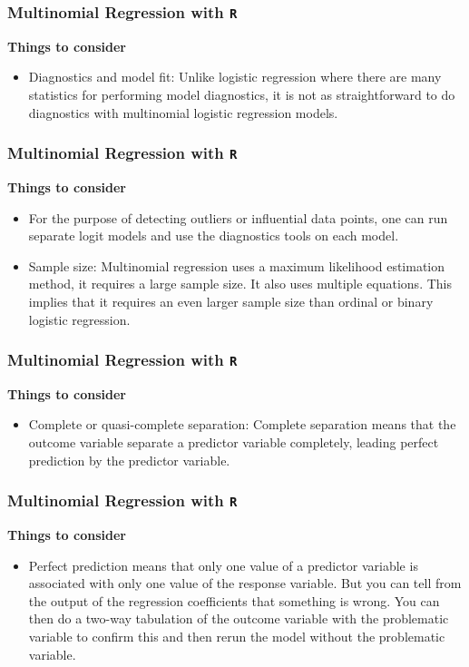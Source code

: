 \documentclass[00-GLMregslides.tex]{subfiles}
\begin{document}
\begin{frame}[fragile]
	
	\frametitle{Multinomial Regression with \texttt{R}}
	\Large
	\textbf{Things to consider}
	\begin{itemize}
		\item Diagnostics and model fit: Unlike logistic regression where there are many statistics for performing model diagnostics, it is not as straightforward to do diagnostics with multinomial logistic regression models.
\end{itemize}

\end{frame}
\begin{frame}[fragile]
	
	\frametitle{Multinomial Regression with \texttt{R}}
	\Large
	\textbf{Things to consider}
	\begin{itemize}
\item For the purpose of detecting outliers or influential data points, one can run separate logit models and use the diagnostics tools on each model. 
\item Sample size: Multinomial regression uses a maximum likelihood estimation method, it requires a large sample size. It also uses multiple equations. This implies that it requires an even larger sample size than ordinal or binary logistic regression.
\end{itemize}

\end{frame}
\begin{frame}[fragile]

\frametitle{Multinomial Regression with \texttt{R}}
\Large
\textbf{Things to consider}
\begin{itemize}
\item Complete or quasi-complete separation: Complete separation means that the outcome variable separate a predictor variable completely, leading perfect prediction by the predictor variable.
\end{itemize}

\end{frame}
\begin{frame}[fragile]
	
	\frametitle{Multinomial Regression with \texttt{R}}
	\Large
	\textbf{Things to consider}
	\begin{itemize}
\item Perfect prediction means that only one value of a predictor variable is associated with only one value of the response variable. But you can tell from the output of the regression coefficients that something is wrong. You can then do a two-way tabulation of the outcome variable with the problematic variable to confirm this and then rerun the model without the problematic variable.
\end{itemize}

\end{frame}
\end{document}
